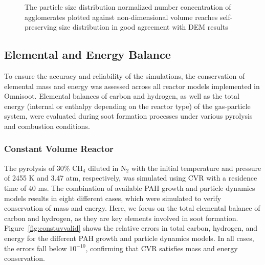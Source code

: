 \begin{figure}[H]
	\centering
	\caption{The particle size distribution normalized number concentration of agglomerates plotted against non-dimensional volume reaches self-preserving size distribution in good agreement with DEM results~\citep{goudeli2015coagulation}}
	\label{fig:coagvalid_contpsd} 
\end{figure}


\subsection{Elemental and Energy Balance}
To ensure the accuracy and reliability of the simulations, the conservation of elemental mass and energy was assessed across all reactor models implemented in Omnisoot. Elemental balances of carbon and hydrogen, as well as the total energy (internal or enthalpy depending on the reactor type) of the gas-particle system, were evaluated during soot formation processes under various pyrolysis and combustion conditions.

\subsubsection{Constant Volume Reactor}
The pyrolysis of 30\% $\mathrm{CH_4}$ diluted in $\mathrm{N_2}$ with the initial temperature and pressure of 2455 K and 3.47 atm, respectively, was simulated using CVR with a residence time of 40 ms. The combination of available PAH growth and particle dynamics models results in eight different cases, which were simulated to verify conservation of mass and energy. Here, we focus on the total elemental balance of carbon and hydrogen, as they are key elements involved in soot formation.
Figure~\ref{fig:constuvvalid} shows the relative errors in total carbon, hydrogen, and energy for the different PAH growth and particle dynamics models. In all cases, the errors fall below $\mathrm{10^{-10}}$, confirming that CVR satisfies mass and energy conservation.

